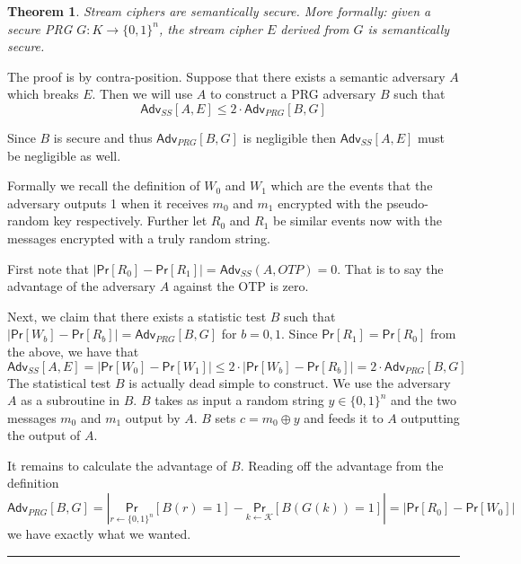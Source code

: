 \documentclass[twoside]{article}
\newcounter{lecnum}
\newtheorem{theorem}{Theorem}[lecnum]
\newenvironment{proof}{{\bf Proof:}}{\hfill\rule{2mm}{2mm}}
\def\Pr{\mathsf{Pr}}
\def\K{\mathcal{K}}
\def\Adv{\mathsf{Adv}}
\begin{document}
\begin{theorem}
Stream ciphers are semantically secure. More formally: given a secure PRG $G: K \rightarrow \{0, 1\}^n$, the stream cipher $E$ derived from $G$ is semantically secure. 
\end{theorem}
\begin{proof}
The proof is by contra-position. Suppose that there exists a semantic adversary $A$ which breaks $E$. Then we will use $A$ to construct a PRG adversary $B$ such that 
\[\Adv_{SS}[A, E] \leq 2 \cdot \Adv_{PRG}[B, G]\]

Since $B$ is secure and thus $\Adv_{PRG}[B, G]$ is negligible then $\Adv_{SS}[A, E]$ must be negligible as well.

Formally we recall the definition of $W_0$ and $W_1$ which are the events that the adversary outputs 1 when it receives $m_0$ and $m_1$ encrypted with the pseudo-random key respectively. Further let $R_0$ and $R_1$ be similar events now with the messages encrypted with a truly random string.

First note that $|\Pr[R_0] - \Pr[R_1]| = \Adv_{SS}(A, OTP) = 0$. That is to say the advantage of the adversary $A$ against the OTP is zero.

Next, we claim that there exists a statistic test $B$ such that $|\Pr[W_b] - \Pr[R_b]| = \Adv_{PRG}[B, G]$ for $b = 0, 1$. Since $\Pr[R_1] = \Pr[R_0]$ from the above, we have that 
\[\Adv_{SS}[A, E] = |\Pr[W_0]
-\Pr[W_1]| \leq 2 \cdot |\Pr[W_b] - \Pr[R_b]| = 2 \cdot \Adv_{PRG}[B, G] \]
The statistical test $B$ is actually dead simple to construct. We use the adversary $A$ as a subroutine in $B$. $B$ takes as input a random string $y \in \{0,1\}^n$ and the two messages $m_0$ and $m_1$ output by $A$. $B$ sets $c = m_0 \oplus y$ and feeds it to $A$ outputting the output of $A$. 

It remains to calculate the advantage of $B$. Reading off the advantage from the definition
\[\Adv_{PRG}[B,G] = \left|\underset{r \leftarrow \{0,1\}^n}{\Pr}[B(r) = 1] - \underset{k \leftarrow \K}{\Pr}[B(G(k)) = 1]\right| = \left|\Pr[R_0] - \Pr[W_0]\right|\]
we have exactly what we wanted.
\end{proof}
\end{document}
